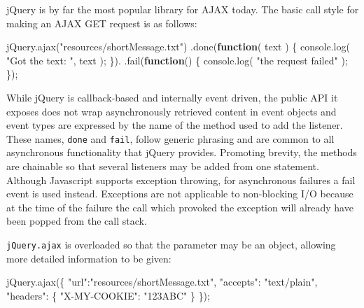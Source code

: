 \documentclass[12pt, ]{article}
\newenvironment{Shaded}{}{}
\newcommand{\KeywordTok}[1]{\textcolor[rgb]{0.00,0.44,0.13}{\textbf{{#1}}}}
\newcommand{\StringTok}[1]{\textcolor[rgb]{0.25,0.44,0.63}{{#1}}}
\newcommand{\OtherTok}[1]{\textcolor[rgb]{0.00,0.44,0.13}{{#1}}}
\newcommand{\FunctionTok}[1]{\textcolor[rgb]{0.02,0.16,0.49}{{#1}}}
\newcommand{\NormalTok}[1]{{#1}}
\begin{document}
jQuery is by far the most popular library for AJAX today. The basic call
style for making an AJAX GET request is as follows:

\begin{Shaded}
\begin{Highlighting}[]
\OtherTok{jQuery}\NormalTok{.}\FunctionTok{ajax}\NormalTok{(}\StringTok{"resources/shortMessage.txt"}\NormalTok{)}
   \NormalTok{.}\FunctionTok{done}\NormalTok{(}\KeywordTok{function}\NormalTok{( text ) \{}
      \OtherTok{console}\NormalTok{.}\FunctionTok{log}\NormalTok{( }\StringTok{"Got the text: "}\NormalTok{, text ); }
   \NormalTok{\}).}
   \NormalTok{.}\FunctionTok{fail}\NormalTok{(}\KeywordTok{function}\NormalTok{() \{}
      \OtherTok{console}\NormalTok{.}\FunctionTok{log}\NormalTok{( }\StringTok{"the request failed"} \NormalTok{);      }
   \NormalTok{\});}
\end{Highlighting}
\end{Shaded}

While jQuery is callback-based and internally event driven, the public
API it exposes does not wrap asynchronously retrieved content in event
objects and event types are expressed by the name of the method used to
add the listener. These names, \texttt{done} and \texttt{fail}, follow
generic phrasing and are common to all asynchronous functionality that
jQuery provides. Promoting brevity, the methods are chainable so that
several listeners may be added from one statement. Although Javascript
supports exception throwing, for asynchronous failures a fail event is
used instead. Exceptions are not applicable to non-blocking I/O because
at the time of the failure the call which provoked the exception will
already have been popped from the call stack.

\texttt{jQuery.ajax} is overloaded so that the parameter may be an
object, allowing more detailed information to be given:

\begin{Shaded}
\begin{Highlighting}[]
\OtherTok{jQuery}\NormalTok{.}\FunctionTok{ajax}\NormalTok{(\{ }\StringTok{"url"}\NormalTok{:}\StringTok{"resources/shortMessage.txt"}\NormalTok{,}
              \StringTok{"accepts"}\NormalTok{: }\StringTok{"text/plain"}\NormalTok{,}
              \StringTok{"headers"}\NormalTok{: \{ }\StringTok{"X-MY-COOKIE"}\NormalTok{: }\StringTok{"123ABC"} \NormalTok{\}}
           \NormalTok{\});}
\end{Highlighting}
\end{Shaded}
\end{document}

